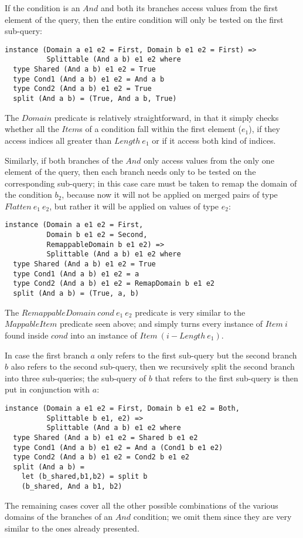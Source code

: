If the condition is an $And$ and both its branches access values from the first element of the query, then the entire condition will only be tested on the first sub-query:
\begin{lstlisting}
instance (Domain a e1 e2 = First, Domain b e1 e2 = First) => 
          Splittable (And a b) e1 e2 where
  type Shared (And a b) e1 e2 = True
  type Cond1 (And a b) e1 e2 = And a b
  type Cond2 (And a b) e1 e2 = True
  split (And a b) = (True, And a b, True)
\end{lstlisting}

The $Domain$ predicate is relatively straightforward, in that it simply checks whether all the $Item$s of a condition fall within the first element ($e_1$), if they access indices all greater than $Length\ e_1$ or if it access both kind of indices.

Similarly, if both branches of the $And$ only access values from the only one element of the query, then each branch needs only to be tested on the corresponding sub-query; in this case care must be taken to remap the domain of the condition $b_2$, because now it will not be applied on merged pairs of type $Flatten\ e_1\ e_2$, but rather it will be applied on values of type $e_2$:
\begin{lstlisting}
instance (Domain a e1 e2 = First, 
          Domain b e1 e2 = Second,
          RemappableDomain b e1 e2) => 
          Splittable (And a b) e1 e2 where
  type Shared (And a b) e1 e2 = True
  type Cond1 (And a b) e1 e2 = a
  type Cond2 (And a b) e1 e2 = RemapDomain b e1 e2
  split (And a b) = (True, a, b)
\end{lstlisting}

The $RemappableDomain\ cond\ e_1\ e_2$ predicate is very similar to the $MappableItem$ predicate seen above; and simply turns every instance of $Item\ i$ found inside $cond$ into an instance of $Item\ (i-Length\ e_1)$.

In case the first branch $a$ only refers to the first sub-query but the second branch $b$ also refers to the second sub-query, then we recursively split the second branch into three sub-queries; the sub-query of $b$ that refers to the first sub-query is then put in conjunction with $a$:
\begin{lstlisting}
instance (Domain a e1 e2 = First, Domain b e1 e2 = Both,
          Splittable b e1, e2) => 
          Splittable (And a b) e1 e2 where
  type Shared (And a b) e1 e2 = Shared b e1 e2
  type Cond1 (And a b) e1 e2 = And a (Cond1 b e1 e2)
  type Cond2 (And a b) e1 e2 = Cond2 b e1 e2
  split (And a b) = 
    let (b_shared,b1,b2) = split b
    (b_shared, And a b1, b2)
\end{lstlisting}

The remaining cases cover all the other possible combinations of the various domains of the branches of an $And$ condition; we omit them since they are very similar to the ones already presented.
